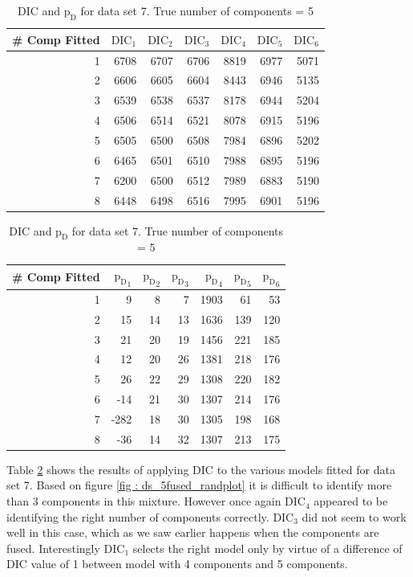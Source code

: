 \begin{table}[!htb]
\centering
\captionsetup{justification=centering}
\caption{DIC and $\text{p}_\text{D}$ for data set 7. True number of components = 5}
\label{table : ds_5fused_dic}
\begin{tabular}{@{}rrrrrrr@{}}
\toprule
\# Comp Fitted & $\text{DIC}_1$ & $\text{DIC}_2$  & $\text{DIC}_3$  & $\text{DIC}_4$  & $\text{DIC}_5$  & $\text{DIC}_6$  \\ \midrule
1 & 6708 & 6707 & 6706 & 8819 & 6977 & 5071 \\
2 & 6606 & 6605 & 6604 & 8443 & 6946 & 5135 \\
3 & 6539 & 6538 & 6537 & 8178 & 6944 & 5204 \\
4 & 6506 & 6514 & 6521 & 8078 & 6915 & 5196 \\
5 & 6505 & 6500 & 6508 & 7984 & 6896 & 5202 \\
6 & 6465 & 6501 & 6510 & 7988 & 6895 & 5196 \\
7 & 6200 & 6500 & 6512 & 7989 & 6883 & 5190 \\
8 & 6448 & 6498 & 6516 & 7995 & 6901 & 5196 \\ \bottomrule
\end{tabular}

\begin{tabular}{@{}rrrrrrr@{}}
\toprule
\# Comp Fitted & ${\text{p}_\text{D}}_1$ & ${\text{p}_\text{D}}_2$ & ${\text{p}_\text{D}}_3$ & ${\text{p}_\text{D}}_4$ & ${\text{p}_\text{D}}_5$ & ${\text{p}_\text{D}}_6$ \\ \midrule
1 & 9 & 8 & 7 & 1903 & 61 & 53 \\
2 & 15 & 14 & 13 & 1636 & 139 & 120 \\
3 & 21 & 20 & 19 & 1456 & 221 & 185 \\
4 & 12 & 20 & 26 & 1381 & 218 & 176 \\
5 & 26 & 22 & 29 & 1308 & 220 & 182 \\
6 & -14 & 21 & 30 & 1307 & 214 & 176 \\
7 & -282 & 18 & 30 & 1305 & 198 & 168 \\
8 & -36 & 14 & 32 & 1307 & 213 & 175 \\ \bottomrule
\end{tabular}
\end{table}

Table \ref{table : ds_5fused_dic} shows the results of applying DIC to the various models fitted for data set 7. Based on figure \ref{fig : ds_5fused_randplot} it is difficult to identify more than 3 components in this mixture. However once again $\text{DIC}_4$ appeared to be identifying the right number of components correctly. $\text{DIC}_3$ did not seem to work well in this case, which as we saw earlier happens when the components are fused. Interestingly $\text{DIC}_1$ selects the right model only by virtue of a difference of DIC value of 1 between model with 4 components and 5 components.\\

